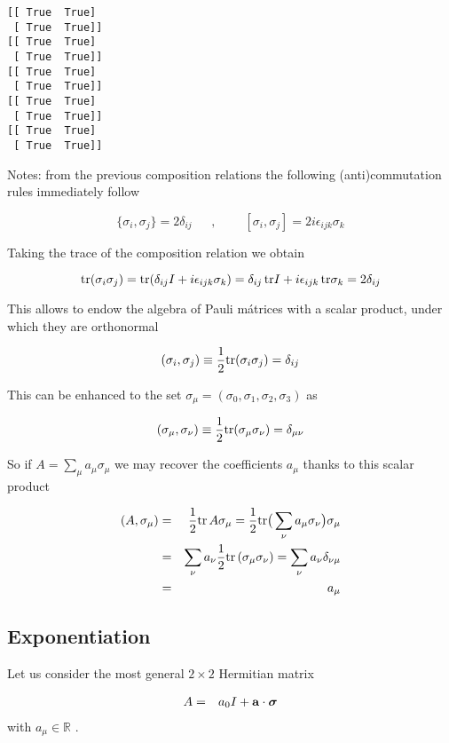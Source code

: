 \documentclass[11pt]{article}
\begin{document}
    \begin{Verbatim}[commandchars=\\\{\}]
[[ True  True]
 [ True  True]]
[[ True  True]
 [ True  True]]
[[ True  True]
 [ True  True]]
[[ True  True]
 [ True  True]]
[[ True  True]
 [ True  True]]
    \end{Verbatim}

    Notes: from the previous composition relations the following
(anti)commutation rules immediately follow

\[
\{\sigma_i,\sigma_j \} = 2\delta_{ij}~~~~~~~,~~~~~~~
~~~[\sigma_i,\sigma_j] = 2i\epsilon_{ijk}\sigma_k
\]

    Taking the trace of the composition relation we obtain

\[
{\rm tr}(\sigma_i\sigma_j) = {\rm tr}(\delta_{ij}I + i\epsilon_{ijk}  \sigma_k)  = 
\delta_{ij} \, {\rm tr}  I + i\epsilon_{ijk} \, {\rm tr} \sigma_k  = 2\delta_{ij}
\]

    This allows to endow the algebra of Pauli mátrices with a scalar
product, under which they are orthonormal

\[
(\sigma_i, \sigma_j) \equiv \frac{1}{2} {\rm tr}(\sigma_i\sigma_j)  =  \delta_{ij}
\]

This can be enhanced to the set
\(\sigma_\mu = (\sigma_0, \sigma_1, \sigma_2, \sigma_3)\) as

\[
(\sigma_\mu, \sigma_\nu) \equiv \frac{1}{2} {\rm tr}(\sigma_\mu\sigma_\nu)  =  \delta_{\mu\nu}
\]

    So if \(A = \sum_\mu a_\mu \sigma_\mu\) we may recover the coefficients
\(a_\mu\) thanks to this scalar product

\begin{eqnarray}
(A, \sigma_\mu) &=& \frac{1}{2} {\rm tr}\, A \sigma_\mu   =  \frac{1}{2} {\rm tr} \big(\sum_\nu a_\mu \sigma_\nu \big) \sigma_\mu \\
&=& \sum_\nu a_\nu \frac{1}{2}{\rm tr} \, (\sigma_\mu \sigma_\nu)  =  \sum_\nu a_\nu \delta_{\nu\mu} \\
&=& a_\mu
\end{eqnarray}

    \subsection{Exponentiation}\label{exponentiation}

    Let us consider the most general \(2\times 2\) Hermitian matrix

\begin{eqnarray}
A &=& a_0 I + {\bf a} \cdot \boldsymbol{\sigma} 
\end{eqnarray} with \(a_\mu\in {\mathbb R}\) .
\end{document}
